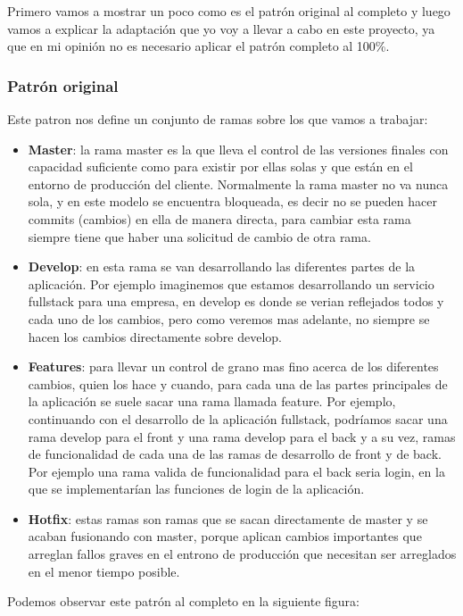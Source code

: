 Primero vamos a mostrar un poco como es el patrón original al completo y luego vamos a explicar la adaptación que yo voy a llevar a cabo en este proyecto, ya que en mi opinión no es necesario aplicar el patrón completo al 100\%. 

\subsubsection*{Patrón original}

Este patron nos define un conjunto de ramas sobre los que vamos a trabajar:
\begin{itemize}
    \item \textbf{Master}: la rama master es la que lleva el control de las versiones finales con capacidad suficiente como para existir por ellas solas y que están en el entorno de producción del cliente. Normalmente la rama master no va nunca sola, y en este modelo se encuentra bloqueada, es decir no se pueden hacer commits (cambios) en ella de manera directa, para cambiar esta rama siempre tiene que haber una solicitud de cambio de otra rama. 
    \item \textbf{Develop}: en esta rama se van desarrollando las diferentes partes de la aplicación. Por ejemplo imaginemos que estamos desarrollando un servicio fullstack para una empresa, en develop es donde se verian reflejados todos y cada uno de los cambios, pero como veremos mas adelante, no siempre se hacen los cambios directamente sobre develop. 
    \item \textbf{Features}: para llevar un control de grano mas fino acerca de los diferentes cambios, quien los hace y cuando, para cada una de las partes principales de la aplicación se suele sacar una rama llamada feature. Por ejemplo, continuando con el desarrollo de la aplicación fullstack, podríamos sacar una rama develop para el front y una rama develop para el back y a su vez, ramas de funcionalidad de cada una de las ramas de desarrollo de front y de back. Por ejemplo una rama valida de funcionalidad para el back seria login, en la que se implementarían las funciones de login de la aplicación. 
    \item \textbf{Hotfix}: estas ramas son ramas que se sacan directamente de master y se acaban fusionando con master, porque aplican cambios importantes que arreglan fallos graves en el entrono de producción que necesitan ser arreglados en el menor tiempo posible. 
\end{itemize}

Podemos observar este patrón al completo en la siguiente figura: 

